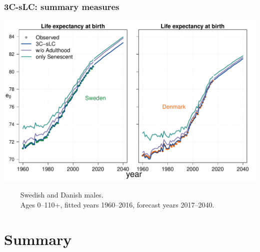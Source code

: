\documentclass[12pt, xcolor=table]{beamer}  %
\begin{document}
\begin{frame}[noframenumbering]\frametitle{3C-sLC: summary measures}

\vspace{-0.5cm}
	
	\begin{center}	
		\vspace{0.4cm}
		
		\includegraphics[scale=.42]{Figures/Ch5/F1_3_M}
		
	\end{center}

\vspace{-0.3cm}
\tiny{$\quad\quad$ Swedish and Danish males. \\ $\quad\quad$ Ages 0--110+, fitted years 1960--2016, forecast years 2017--2040.}
	
\end{frame}

\section{Summary}
\end{document}
